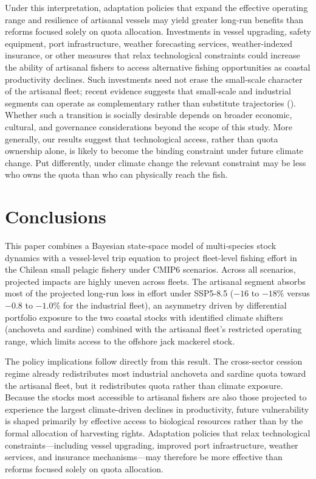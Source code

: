 \documentclass[
  11pt,
]{article}
\begin{document}
Under this interpretation, adaptation policies that expand the effective operating range and resilience of artisanal vessels may yield greater long-run benefits than reforms focused solely on quota allocation. Investments in vessel upgrading, safety equipment, port infrastructure, weather forecasting services, weather-indexed insurance, or other measures that relax technological constraints could increase the ability of artisanal fishers to access alternative fishing opportunities as coastal productivity declines. Such investments need not erase the small-scale character of the artisanal fleet; recent evidence suggests that small-scale and industrial segments can operate as complementary rather than substitute trajectories (). Whether such a transition is socially desirable depends on broader economic, cultural, and governance considerations beyond the scope of this study. More generally, our results suggest that technological access, rather than quota ownership alone, is likely to become the binding constraint under future climate change. Put differently, under climate change the relevant constraint may be less who owns the quota than who can physically reach the fish.

\section{Conclusions}\label{conclusions}

This paper combines a Bayesian state-space model of multi-species stock dynamics with a vessel-level trip equation to project fleet-level fishing effort in the Chilean small pelagic fishery under CMIP6 scenarios. Across all scenarios, projected impacts are highly uneven across fleets. The artisanal segment absorbs most of the projected long-run loss in effort under SSP5-8.5 (\(-16\) to \(-18\%\) versus \(-0.8\) to \(-1.0\%\) for the industrial fleet), an asymmetry driven by differential portfolio exposure to the two coastal stocks with identified climate shifters (anchoveta and sardine) combined with the artisanal fleet's restricted operating range, which limits access to the offshore jack mackerel stock.

The policy implications follow directly from this result. The cross-sector cession regime already redistributes most industrial anchoveta and sardine quota toward the artisanal fleet, but it redistributes quota rather than climate exposure. Because the stocks most accessible to artisanal fishers are also those projected to experience the largest climate-driven declines in productivity, future vulnerability is shaped primarily by effective access to biological resources rather than by the formal allocation of harvesting rights. Adaptation policies that relax technological constraints---including vessel upgrading, improved port infrastructure, weather services, and insurance mechanisms---may therefore be more effective than reforms focused solely on quota allocation.
\end{document}
